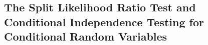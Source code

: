 \subsection{The Split Likelihood Ratio Test and Conditional Independence Testing for Conditional Random Variables}

